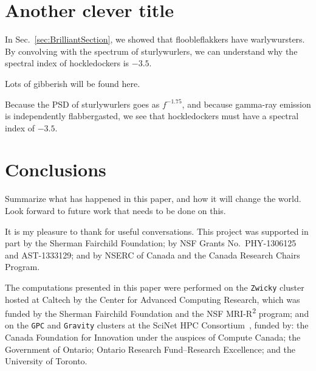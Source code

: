 \documentclass[reprint, aps, prd, letterpaper, noshowpacs, amsmath, %
amssymb, amsfonts, nofootinbib, floatfix, superscriptaddress, %
twoside]{revtex4-1}
\begin{document}
\section{Another clever title}
\label{sec:AnotherCleverOne}
In Sec.~\ref{sec:BrilliantSection}, we showed that floobleflakkers
have warlywursters.  By convolving with the spectrum of sturlywurlers,
we can understand why the spectral index of hockledockers is $-3.5$.

Lots of gibberish will be found here.

Because the PSD of sturlywurlers goes as $f^{-1.75}$, and because
gamma-ray emission is independently flabbergasted, we see that
hockledockers must have a spectral index of $-3.5$.


\section{Conclusions}
\label{sec:Conclusions}
Summarize what has happened in this paper, and how it will change the
world.  Look forward to future work that needs to be done on this.


\begin{acknowledgments}
  It is my pleasure to thank  for useful
  conversations.  This project was supported in part by the Sherman
  Fairchild Foundation; by NSF Grants No.\ PHY-1306125 and
  AST-1333129; and by NSERC of Canada and the Canada Research Chairs
  Program.

  The computations presented in this paper were performed on the
  \texttt{Zwicky} cluster hosted at Caltech by the Center for Advanced
  Computing Research, which was funded by the Sherman Fairchild
  Foundation and the NSF MRI-R\textsuperscript{2} program; and on the
  \texttt{GPC} and \texttt{Gravity} clusters at the SciNet HPC
  Consortium~\cite{scinet}, funded by: the Canada Foundation for
  Innovation under the auspices of Compute Canada; the Government of
  Ontario; Ontario Research Fund--Research Excellence; and the
  University of Toronto.
\end{acknowledgments}




\appendix* %
\end{document}
